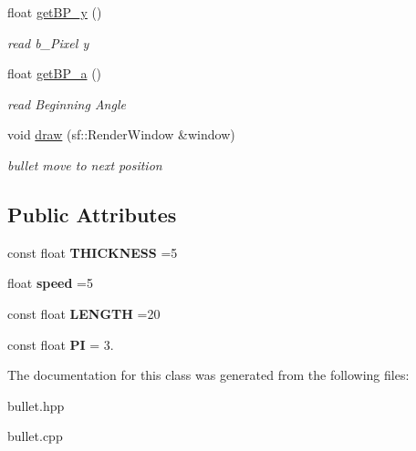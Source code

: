 \begin{DoxyCompactItemize}
float \mbox{\hyperlink{classbullet_a4570072fe279fcf9eb036ff26b513676}{get\+B\+P\+\_\+y}} ()
\begin{DoxyCompactList}\small\item\em read b\+\_\+\+Pixel y \end{DoxyCompactList}\item 
\mbox{\label{classbullet_af5330e03529881993a13327e6b9b6639}} 
float \mbox{\hyperlink{classbullet_af5330e03529881993a13327e6b9b6639}{get\+B\+P\+\_\+a}} ()
\begin{DoxyCompactList}\small\item\em read Beginning Angle \end{DoxyCompactList}\item 
\mbox{\label{classbullet_ae890ac6cd03448af82016e1a6971c30d}} 
void \mbox{\hyperlink{classbullet_ae890ac6cd03448af82016e1a6971c30d}{draw}} (sf\+::\+Render\+Window \&window)
\begin{DoxyCompactList}\small\item\em bullet move to next position \end{DoxyCompactList}\end{DoxyCompactItemize}
\subsection*{Public Attributes}
\begin{DoxyCompactItemize}
\item 
\mbox{\label{classbullet_a45b6fb30b6604ae53d0e391291a2078d}} 
const float {\bfseries T\+H\+I\+C\+K\+N\+E\+SS} =5
\item 
\mbox{\label{classbullet_aa58f35dbb121af234964a3b76b1d83d9}} 
float {\bfseries speed} =5
\item 
\mbox{\label{classbullet_ade9b7554e1bc749e9cb6842a85b45e2c}} 
const float {\bfseries L\+E\+N\+G\+TH} =20
\item 
\mbox{\label{classbullet_a726afcb95ab509d0c95d56ca007dea73}} 
const float {\bfseries PI} = 3.
\end{DoxyCompactItemize}


The documentation for this class was generated from the following files\+:\begin{DoxyCompactItemize}
\item 
bullet.\+hpp\item 
bullet.\+cpp\end{DoxyCompactItemize}
